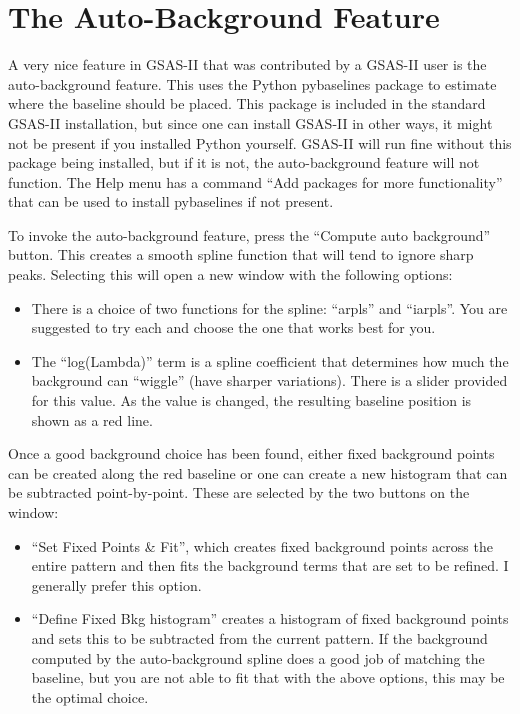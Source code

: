 \section{The Auto-Background Feature}
\label{ref:autobackground}
A very nice feature in GSAS-II that was contributed by a GSAS-II user is the auto-background feature. This uses the Python pybaselines package to estimate where the baseline should be placed. This package is included in the standard GSAS-II installation, but since one can install GSAS-II in other ways, it might not be present if you installed Python yourself. GSAS-II will run fine without this package being installed, but if it is not, the auto-background feature will not function. The Help menu has a command ``Add packages for more functionality'' that can be used to install pybaselines if not present. 

To invoke the auto-background feature, press the ``Compute auto background'' button. 
This creates a smooth spline function that will tend to ignore sharp peaks. Selecting this will open a new window with the following options: 

 \begin{itemize}
     \item There is a choice of two functions for the spline: ``arpls'' and ``iarpls''. You are suggested to try each and choose the one that works best for you. 
     \item The ``log(Lambda)'' term is a spline coefficient that determines how much the background can ``wiggle'' (have sharper variations). There is a slider provided for this value. As the value is changed, the resulting baseline position is shown as a red line. 
 \end{itemize}
 
Once a good background choice has been found, either fixed background points can be created along the red baseline or one can create a new histogram that can be subtracted point-by-point. These are selected by the two buttons on the window: 
\begin{itemize}
    \item ``Set Fixed Points \& Fit'', which creates fixed background points across the entire pattern and then fits the background terms that are set to be refined. I generally prefer this option.
    \item ``Define Fixed Bkg histogram'' creates a histogram of fixed background points and sets this to be subtracted from the current pattern. If the background computed by the auto-background spline does a good job of matching the baseline, but you are not able to fit that with the above options, this may be the  optimal choice. 
\end{itemize}

